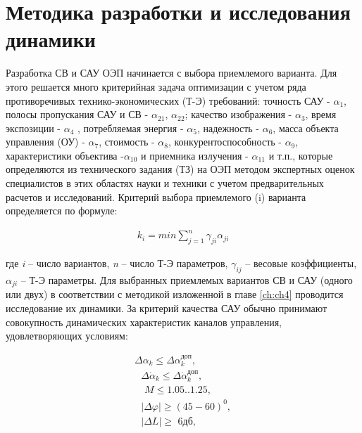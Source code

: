 \section{Методика разработки и исследования динамики} \label{sec:ch2/sec1-}


Разработка СВ и САУ ОЭП начинается с выбора приемлемого варианта. Для этого решается много критерийная задача оптимизации с учетом ряда противоречивых технико-экономических (Т-Э) требований: точность САУ -  $\alpha_{1}$, полосы пропускания САУ и СВ - $\alpha_{21}$, $\alpha_{22}$; качество изображения -  $\alpha_{3}$, время экспозиции -  $\alpha_{4}$ , потребляемая энергия -  $\alpha_{5}$, надежность -  $\alpha_{6}$, масса объекта управления (ОУ) -  $\alpha_{7}$, стоимость -  $\alpha_{8}$, конкурентоспособность - $\alpha_{9}$, характеристики объектива -$\alpha_{10}$ и приемника излучения - $\alpha_{11}$ и т.п., которые определяются из технического задания (ТЗ) на ОЭП методом экспертных оценок специалистов в этих областях науки и техники с учетом предварительных расчетов и исследований. Критерий выбора приемлемого (i) варианта определяется по формуле:

\begin{equation}
\label{eq:p2:1}
\begin{alignedat}{2}
k_i=min\sum_{j=1}^n{\gamma _{ji}\alpha _{ji}}
\end{alignedat}
\end{equation}

где \textit{i} – число вариантов, \textit{n} – число Т-Э параметров, $\gamma_{ij}$ – весовые коэффициенты, $\alpha_{ji}$ – Т-Э параметры. Для выбранных приемлемых вариантов  СВ и САУ (одного или двух) в соответствии с методикой изложенной в главе \ref{ch:ch4} проводится исследование их динамики. За критерий качества САУ обычно принимают совокупность динамических характеристик каналов управления, удовлетворяющих условиям:

\begin{equation}
\label{eq:p2:2}
\begin{alignedat}{2}
\varDelta \alpha _k\leqslant \varDelta \alpha _{k}^{\textit{доп}},
\\
\,\,\,\,\varDelta \dot{\alpha}_k\leqslant \varDelta \dot{\alpha}_{k}^{\textit{доп}},
\\
\,\,\,\,\,\,M\leqslant \text{1.05..1.25,}
\\
\,\,\,\,\left| \left. \varDelta \varphi \right| \right. \geqslant \left( 45-60 \right) ^0,
\\
\,\,\,\,\left| \left. \varDelta L \right|\geqslant \,\,\textit{6дб}, \right. 
\end{alignedat}
\end{equation}

